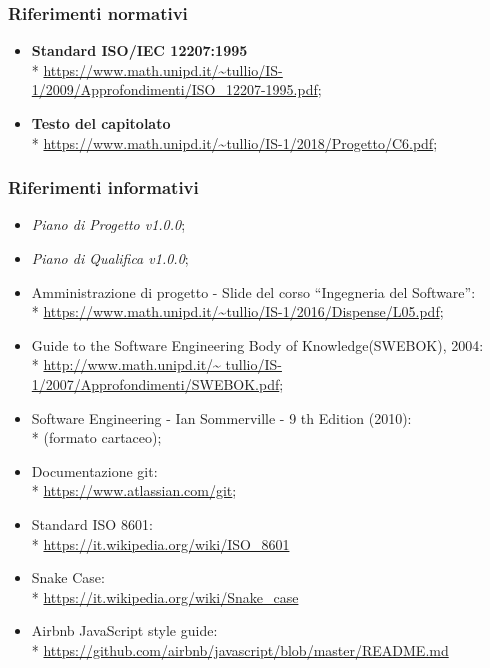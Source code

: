 \subsubsection{Riferimenti normativi}
\begin{itemize}
	\item \textbf{Standard ISO/IEC 12207:1995} \\* 
		\url{https://www.math.unipd.it/~tullio/IS-1/2009/Approfondimenti/ISO_12207-1995.pdf};
	\item \textbf{Testo del capitolato\glo} \\*  
		\url{https://www.math.unipd.it/~tullio/IS-1/2018/Progetto/C6.pdf};
\end{itemize}

\subsubsection{Riferimenti informativi}
\begin{itemize}
	\item \textit{Piano di Progetto v1.0.0};
	\item \textit{Piano di Qualifica v1.0.0};
	\item Amministrazione di progetto - Slide del corso “Ingegneria del
		Software”: \\*
		\url{https://www.math.unipd.it/~tullio/IS-1/2016/Dispense/L05.pdf};
	\item Guide to the Software Engineering Body of Knowledge(SWEBOK), 2004: \\*
		\url{http://www.math.unipd.it/~	tullio/IS-1/2007/Approfondimenti/SWEBOK.pdf};
	\item Software Engineering - Ian Sommerville - 9 th Edition (2010): \\*
		(formato cartaceo);
	\item Documentazione git: \\*
		\url{https://www.atlassian.com/git};
	\item Standard ISO 8601: \\*
		\url{https://it.wikipedia.org/wiki/ISO_8601}
	\item Snake Case\glo: \\*
		\url{https://it.wikipedia.org/wiki/Snake_case}
	\item Airbnb JavaScript style guide: \\*
		\url{https://github.com/airbnb/javascript/blob/master/README.md}
		
	
\end{itemize}
